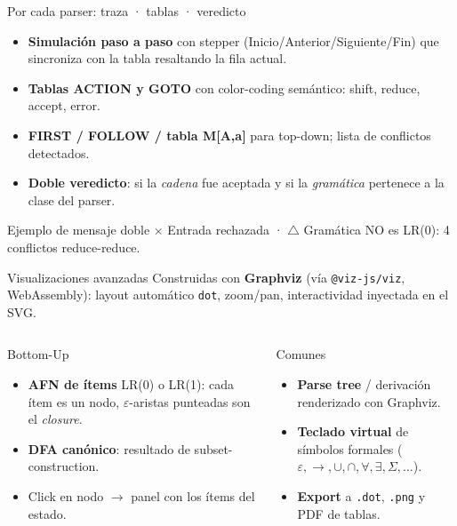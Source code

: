 \documentclass[aspectratio=169,10pt]{beamer}
\begin{document}
\begin{frame}{Por cada parser: traza · tablas · veredicto}
  \begin{itemize}
    \item \textbf{Simulación paso a paso} con stepper (Inicio/Anterior/Siguiente/Fin)
      que sincroniza con la tabla resaltando la fila actual.
    \item \textbf{Tablas ACTION y GOTO} con color-coding semántico:
      \textcolor{plSuccess}{shift}, \textcolor{plPrimary}{reduce},
      \textcolor{plWarning}{accept}, \textcolor{plDanger}{error}.
    \item \textbf{FIRST / FOLLOW / tabla M[A,a]} para top-down; lista de
      conflictos detectados.
    \item \textbf{Doble veredicto}: si la \emph{cadena} fue aceptada y si la
      \emph{gramática} pertenece a la clase del parser.
  \end{itemize}

  \begin{exampleblock}{Ejemplo de mensaje doble}
    \textcolor{plDanger}{$\times$ Entrada rechazada} ·
    \textcolor{plWarning}{$\triangle$ Gramática NO es LR(0): 4 conflictos reduce-reduce.}
  \end{exampleblock}
\end{frame}

\begin{frame}{Visualizaciones avanzadas}
  Construidas con \textbf{Graphviz} (vía \texttt{@viz-js/viz}, WebAssembly):
  layout automático \texttt{dot}, zoom/pan, interactividad inyectada en el SVG.

  \begin{columns}[T]
    \begin{block}{Bottom-Up}
      \begin{itemize}
        \item \textbf{AFN de ítems} LR(0) o LR(1): cada ítem es un nodo,
          $\varepsilon$-aristas punteadas son el \emph{closure}.
        \item \textbf{DFA canónico}: resultado de subset-construction.
        \item Click en nodo $\to$ panel con los ítems del estado.
      \end{itemize}
    \end{block}

    \begin{block}{Comunes}
      \begin{itemize}
        \item \textbf{Parse tree} / derivación renderizado con Graphviz.
        \item \textbf{Teclado virtual} de símbolos formales
          ($\varepsilon, \to, \cup, \cap, \forall, \exists, \Sigma, \ldots$).
        \item \textbf{Export} a \texttt{.dot}, \texttt{.png} y PDF de tablas.
      \end{itemize}
    \end{block}
  \end{columns}
\end{frame}
\end{document}
